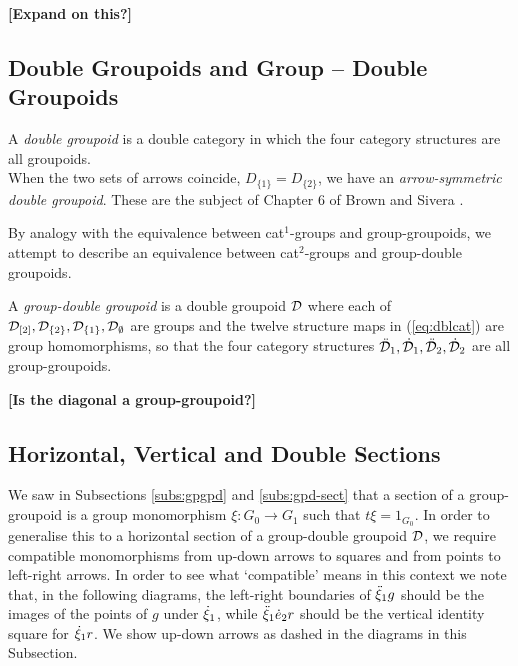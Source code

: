 \medskip\noindent
{\bf [Expand on this?]}


\subsection{Double Groupoids and Group -- Double Groupoids} 
\label{subs:dblgpd}

A \emph{double groupoid} is a double category in which the four 
category structures are all groupoids.\\
When the two sets of arrows coincide, $D_{\{1\}}=D_{\{2\}}$, 
we have an \emph{arrow-symmetric double groupoid}.
These are the subject of Chapter 6 of Brown and Sivera \cite{brow:siv}.

\medskip
By analogy with the equivalence between cat$^1$-groups and group-groupoids, 
we attempt to describe an equivalence between cat$^2$-groups and
group-double groupoids.

\begin{defn} 
A \emph{group-double groupoid} is a double groupoid $\mathcal{D}$ 
where each of 
$\mathcal{D}_{[2]}, \mathcal{D}_{\{2\}}, \mathcal{D}_{\{1\}}, \mathcal{D}_{\emptyset}$ are groups 
and the twelve structure maps in (\ref{eq:dblcat}) are group homomorphisms, 
so that the four category structures 
$\ddot{\mathcal{D}}_1, \dot{\mathcal{D}}_1, \ddot{\mathcal{D}}_2, \dot{\mathcal{D}}_2$ are all group-groupoids.
\end{defn}

\bigskip\noindent
{\bf [Is the diagonal a group-groupoid?]}



\subsection{Horizontal, Vertical and Double Sections} \label{subs:dsect}

We saw in Subsections \ref{subs:gpgpd} and \ref{subs:gpd-sect} 
that a section of a group-groupoid is a group monomorphism 
$\xi : G_0 \to G_1$ such that $t\xi = 1_{G_0}$.
In order to generalise this to a horizontal section of a 
group-double groupoid $\mathcal{D}$, we require compatible monomorphisms 
from up-down arrows to squares and from points to left-right arrows.
In order to see what `compatible' means in this context 
we note that, in the following diagrams, the left-right boundaries of
$\ddot{\xi}_1 g$ should be the images of the points of $g$ under $\dot{\xi}_1$, 
while $\ddot{\xi}_1\dot{e}_2 r$ should be the vertical identity square for $\dot{\xi}_1 r$.
We show up-down arrows as dashed in the diagrams in this Subsection.

